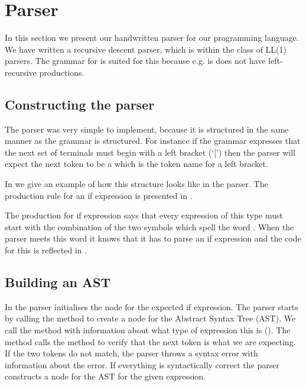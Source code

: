 \section{Parser}

In this section we present our handwritten parser for our programming language.
We have written a recursive descent parser, which is within the class of LL(1)
parsers. The grammar for \productname{} is suited for this because e.g. is does
not have left-recursive productions. 

\subsection{Constructing the parser}
The parser was very simple to implement, because it is structured in the same
manner as the grammar is structured. For instance if the grammar expresses that
the next set of terminals must begin with a left bracket (`[') then the parser
will expect the next token to be a  which is the token name
for a left bracket. 

In  we give an example of how this structure looks like in
the parser. The production rule for an if expression is presented in
.


The production for if expression says that every expression of this type must
start with the combination of the two symbols which spell the word .
When the parser meets this word it knows that it has to parse an if expression
and the code for this is reflected in .



\subsection{Building an AST}
In  the parser initialises the node for the expected if
expression. The parser starts by calling the method  to
create a node for the Abstract Syntax Tree (AST). We call the method with
information about what type of expression this is (). The
method calls the  method to verify that the next token is what
we are expecting. If the two tokens do not match, the parser throws a syntax
error with information about the error. If everything is syntactically correct
the parser constructs a node for the AST for the given expression.

